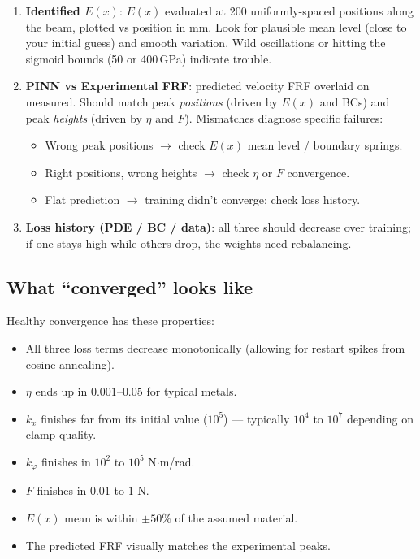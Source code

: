 \documentclass[11pt,a4paper]{article}
\begin{document}
\begin{enumerate}[leftmargin=*, itemsep=2pt]
\item \textbf{Identified $E(x)$}: $E(x)$ evaluated at 200 uniformly-spaced positions along the beam, plotted vs position in mm. Look for plausible mean level (close to your initial guess) and smooth variation. Wild oscillations or hitting the sigmoid bounds (50 or 400\,GPa) indicate trouble.

\item \textbf{PINN vs Experimental FRF}: predicted velocity FRF overlaid on measured. Should match peak \emph{positions} (driven by $E(x)$ and BCs) and peak \emph{heights} (driven by $\eta$ and $F$). Mismatches diagnose specific failures:
\begin{itemize}[leftmargin=*, itemsep=1pt]
\item Wrong peak positions $\to$ check $E(x)$ mean level / boundary springs.
\item Right positions, wrong heights $\to$ check $\eta$ or $F$ convergence.
\item Flat prediction $\to$ training didn't converge; check loss history.
\end{itemize}

\item \textbf{Loss history (PDE / BC / data)}: all three should decrease over training; if one stays high while others drop, the weights need rebalancing.
\end{enumerate}

\subsection{What ``converged'' looks like}

Healthy convergence has these properties:
\begin{itemize}[leftmargin=*, itemsep=2pt]
\item All three loss terms decrease monotonically (allowing for restart spikes from cosine annealing).
\item $\eta$ ends up in $0.001$--$0.05$ for typical metals.
\item $k_x$ finishes far from its initial value ($10^5$) --- typically $10^4$ to $10^7$ depending on clamp quality.
\item $k_\varphi$ finishes in $10^2$ to $10^5$ N$\cdot$m/rad.
\item $F$ finishes in $0.01$ to $1$ N.
\item $E(x)$ mean is within $\pm 50\%$ of the assumed material.
\item The predicted FRF visually matches the experimental peaks.
\end{itemize}
\end{document}
